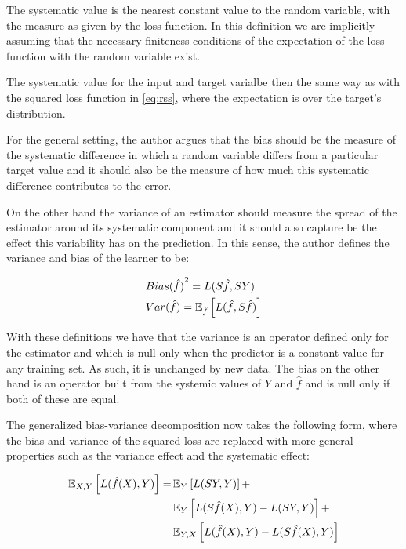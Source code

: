 \begin{appendices}
The systematic value is the nearest constant value to the random variable, with the measure as given by the loss function.
In this definition we are implicitly assuming that the necessary finiteness conditions of the expectation of the loss function with the random variable exist.

The systematic value for the input and target varialbe then the same way as with the squared loss function in \cref{eq:rss}, where the expectation is over the target's distribution.

For the general setting, the author argues that the bias should be the measure of the systematic difference in which a random variable differs from a particular target value and it should also be the measure of how much this systematic difference contributes to the error.

On the other hand the variance of an estimator should measure the spread of the estimator around its systematic component and it should also capture be the effect this variability has on the prediction.
In this sense, the author defines the variance and bias of the learner to be:

\begin{equation}
\begin{split}
& {Bias(\hat{f})}^2 = L(S\hat{f},SY) \\
& Var(\hat{f}) = \operatorname{\mathbb{E}}_{\hat{f}} \left[ L(\hat{f} , S\hat{f}) \right]
\end{split}
\end{equation}

With these definitions we have that the variance is an operator defined only for the estimator and which is null only when the predictor is a constant value for any training set.
As such, it is unchanged by new data.
The bias on the other hand is an operator built from the systemic values of $Y$ and $\hat{f}$ and is null only if both of these are equal.

The generalized bias-variance decomposition now takes the following form, where the bias and variance of the squared loss are replaced with more general properties such as the variance effect and the systematic effect:

\begin{equation}
\begin{split}
\operatorname{\mathbb{E}}_{X,Y} \left[ L(\hat{f}(X),Y )\right] = & \operatorname{\mathbb{E}}_{Y} \left[ L(SY,Y )\right] + \\
 & \operatorname{\mathbb{E}}_{Y} \left[ L(S\hat{f}(X),Y ) - L(SY,Y )\right] + \\
 & \operatorname{\mathbb{E}}_{Y,X} \left[ L(\hat{f}(X),Y ) - L(S\hat{f}(X),Y )\right]
\end{split}
\end{equation}


\end{appendices}
